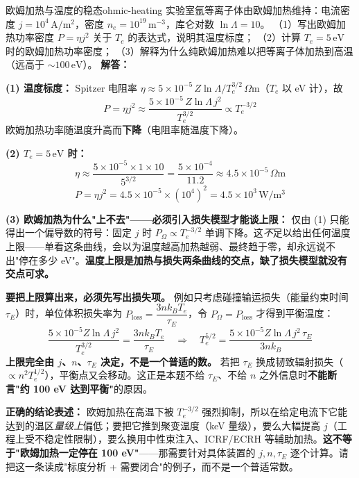 \begin{example}{欧姆加热与温度的稳态}{ohmic-heating}
实验室氩等离子体由欧姆加热维持：电流密度 $j = 10^4\,\mathrm{A/m^2}$，密度 $n_e = 10^{19}\,\mathrm{m^{-3}}$，库仑对数 $\ln\Lambda = 10$。
（1）写出欧姆加热功率密度 $P = \eta j^2$ 关于 $T_e$ 的表达式，说明其温度标度；
（2）计算 $T_e = 5\,\mathrm{eV}$ 时的欧姆加热功率密度；
（3）解释为什么纯欧姆加热难以把等离子体加热到高温（远高于 $\sim100\,\mathrm{eV}$）。
\tcblower
\textbf{解答：}

\textbf{(1) 温度标度：} Spitzer 电阻率 $\eta \approx 5\times10^{-5}\,Z\ln\Lambda/T_e^{3/2}\,\Omega\mathrm{m}$（$T_e$ 以 eV 计），故
\[
P = \eta j^2 \approx \frac{5\times10^{-5}\,Z\ln\Lambda\,j^2}{T_e^{3/2}} \propto T_e^{-3/2}
\]
欧姆加热功率随温度升高而\textbf{下降}（电阻率随温度下降）。

\textbf{(2) $T_e = 5\,\mathrm{eV}$ 时：}
\[
\eta \approx \frac{5\times10^{-5}\times1\times10}{5^{3/2}} = \frac{5\times10^{-4}}{11.2} \approx 4.5\times10^{-5}\,\Omega\mathrm{m}
\]
\[
P = \eta j^2 = 4.5\times10^{-5}\times(10^4)^2 = 4.5\times10^3\,\mathrm{W/m^3}
\]

\textbf{(3) 欧姆加热为什么"上不去"——必须引入损失模型才能谈上限：}
仅由 (1) 只能得出一个偏导数的符号：固定 $j$ 时 $P_\Omega\propto T_e^{-3/2}$ 单调下降。这\emph{不}足以给出任何温度上限——单看这条曲线，会以为温度越高加热越弱、最终趋于零，却永远说不出"停在多少 eV"。\textbf{温度上限是加热与损失两条曲线的交点，缺了损失模型就没有交点可求。}

\textbf{要把上限算出来，必须先写出损失项。} 例如只考虑碰撞输运损失（能量约束时间 $\tau_E$）时，单位体积损失率为 $P_{\text{loss}} = \dfrac{3nk_{\!B}T_e}{\tau_E}$，令 $P_\Omega=P_{\text{loss}}$ 才得到平衡温度：
\[
\frac{5\times10^{-5}Z\ln\Lambda\,j^2}{T_e^{3/2}} = \frac{3nk_{\!B}T_e}{\tau_E}
\quad\Longrightarrow\quad
T_e^{5/2} = \frac{5\times10^{-5}Z\ln\Lambda\,j^2\,\tau_E}{3nk_{\!B}}
\]
\textbf{上限完全由 $j$、$n$、$\tau_E$ 决定，不是一个普适的数。} 若把 $\tau_E$ 换成韧致辐射损失（$\propto n^2T_e^{1/2}$），平衡点又会移动。这正是本题不给 $\tau_E$、不给 $n$ 之外信息时\textbf{不能断言"约 100 eV 达到平衡"}的原因。

\textbf{正确的结论表述：} 欧姆加热在高温下被 $T_e^{-3/2}$ 强烈抑制，所以在给定电流下它能达到的温区\emph{量级上}偏低；要把它推到聚变温度（keV 量级），要么大幅提高 $j$（工程上受不稳定性限制），要么换用中性束注入、ICRF/ECRH 等辅助加热。\textbf{这不等于"欧姆加热一定停在 100 eV"}——那需要针对具体装置的 $j,n,\tau_E$ 逐个计算。请把这一条读成"标度分析 + 需要闭合"的例子，而不是一个普适常数。
\end{example}

